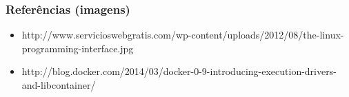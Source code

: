 \documentclass{beamer}
\begin{document}
\begin{frame}
    \frametitle{Referências (imagens)}
    \begin{itemize}
        \item http://www.servicioswebgratis.com/wp-content/uploads/2012/08/the-linux-programming-interface.jpg
        \item http://blog.docker.com/2014/03/docker-0-9-introducing-execution-drivers-and-libcontainer/
    \end{itemize}
\end{frame}
\end{document}
